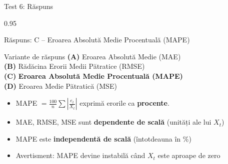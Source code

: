 \documentclass[9pt, aspectratio=169, t]{beamer}
\begin{document}
\begin{frame}{Test 6: Răspuns}
    \begin{cminipage}{0.95\textwidth}
    \begin{exampleblock}{Răspuns: C -- Eroarea Absolută Medie Procentuală (MAPE)}
    {\small
        \begin{block}{Variante de răspuns}
            \textcolor{MainBlue}{\textbf{(A)}} Eroarea Absolută Medie (MAE) \incorrect\\[3pt]
            \textcolor{MainBlue}{\textbf{(B)}} Rădăcina Erorii Medii Pătratice (RMSE) \incorrect\\[3pt]
            \textcolor{MainBlue}{\textbf{(C)}} \textbf{\textcolor{Forest}{Eroarea Absolută Medie Procentuală (MAPE)}} \correct\\[3pt]
            \textcolor{MainBlue}{\textbf{(D)}} Eroarea Medie Pătratică (MSE) \incorrect
        \end{block}

        \vspace{0.1cm}

        \begin{itemize}\setlength{\itemsep}{0pt}
            \item MAPE $= \frac{100}{n}\sum\left|\frac{e_t}{X_t}\right|$ exprimă erorile ca \textbf{procente}.
            \item MAE, RMSE, MSE sunt \textbf{dependente de scală} (unități ale lui $X_t$)
            \item MAPE este \textbf{independentă de scală} (întotdeauna în \%)
            \item Avertisment: MAPE devine instabilă când $X_t$ este aproape de zero
        \end{itemize}
    }
    \end{exampleblock}
    \end{cminipage}
\end{frame}
\end{document}
